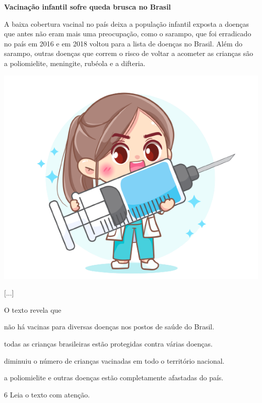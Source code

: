 \begin{myquote}
\textbf{Vacinação infantil sofre queda brusca no Brasil}

A baixa cobertura vacinal no país deixa a população infantil exposta a
doenças que antes não eram mais uma preocupação, como o sarampo, que foi
erradicado no país em 2016 e em 2018 voltou para a lista de doenças no
Brasil. Além do sarampo, outras doenças que correm o risco de voltar a
acometer as crianças são a poliomielite, meningite, rubéola e a
difteria.

\begin{center}
\includegraphics[width=.5\textwidth]{./media/image23g.png}
\end{center}

{[}...{]}

\end{myquote}

O texto revela que

\begin{escolha}
\item não há vacinas para diversas doenças nos postos de saúde do Brasil.

\item todas as crianças brasileiras estão protegidas contra várias doenças.

\item diminuiu o número de crianças vacinadas em todo o território nacional.

\item a poliomielite e outras doenças estão completamente afastadas do país.
\end{escolha}


\num{6} Leia o texto com atenção.

